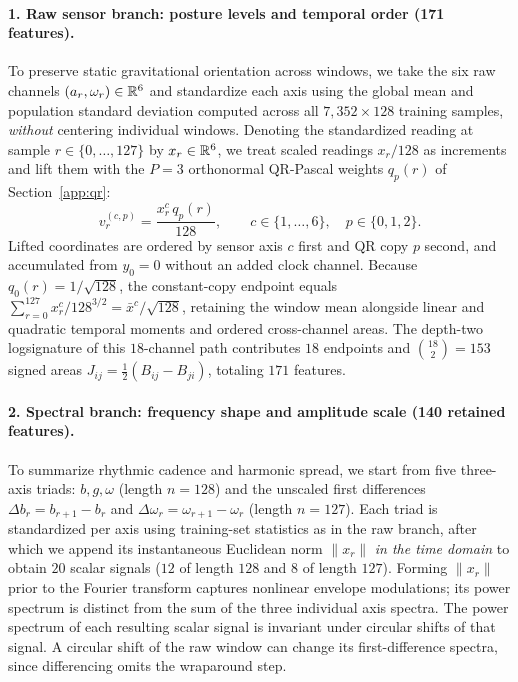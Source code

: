 \paragraph{1. Raw sensor branch: posture levels and temporal order (171 features).}
To preserve static gravitational orientation across windows, we take the six raw
channels \((a_r, \omega_r) \in \mathbb{R}^6\) and standardize each axis using the global
mean and population standard deviation computed across all \(7{,}352 \times 128\)
training samples, \emph{without} centering individual windows. Denoting the
standardized reading at sample \(r \in \{0, \ldots, 127\}\) by \(x_r \in \mathbb{R}^6\),
we treat scaled readings \(x_r / 128\) as increments and lift them with the
\(P = 3\) orthonormal QR-Pascal weights \(q_p(r)\) of Section~\ref{app:qr}:
\[
 v_r^{(c, p)} = \frac{x_r^c\,q_p(r)}{128},
 \qquad c \in \{1, \ldots, 6\},\quad p \in \{0, 1, 2\}.
\]
Lifted coordinates are ordered by sensor axis \(c\) first and QR copy \(p\)
second, and accumulated from \(y_0 = 0\) without an added clock channel. Because
\(q_0(r) = 1/\sqrt{128}\), the constant-copy endpoint equals
\(\sum_{r=0}^{127} x_r^c / 128^{3/2} = \bar x^c / \sqrt{128}\), retaining the
window mean alongside linear and quadratic temporal moments and ordered
cross-channel areas. The depth-two logsignature of this \(18\)-channel path
contributes \(18\) endpoints and \(\binom{18}{2} = 153\) signed areas
\(J_{ij} = \tfrac12(B_{ij} - B_{ji})\), totaling \(171\) features.

\paragraph{2. Spectral branch: frequency shape and amplitude scale (140 retained features).}
To summarize rhythmic cadence and harmonic spread, we start from five
three-axis triads: \(b, g, \omega\) (length \(n = 128\)) and the
unscaled first differences \(\Delta b_r = b_{r+1} - b_r\) and
\(\Delta \omega_r = \omega_{r+1} - \omega_r\) (length \(n = 127\)). Each triad is
standardized per axis using training-set statistics as in the raw branch, after
which we append its instantaneous Euclidean norm \(\|x_r\|\) \emph{in the time
domain} to obtain \(20\) scalar signals (\(12\) of length \(128\) and \(8\) of
length \(127\)). Forming \(\|x_r\|\) prior to the Fourier transform captures
nonlinear envelope modulations; its power spectrum is distinct from the sum of
the three individual axis spectra. The power spectrum of each resulting scalar
signal is invariant under circular shifts of that signal. A circular shift of
the raw window can change its first-difference spectra, since differencing
omits the wraparound step.

